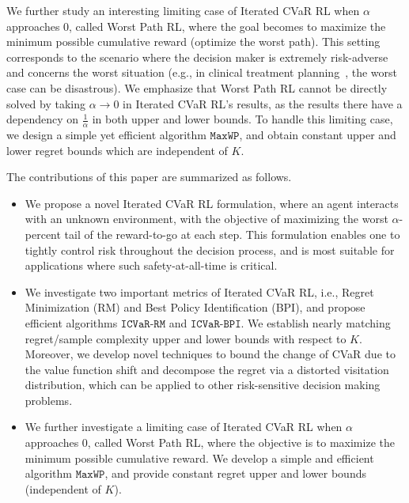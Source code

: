 \documentclass{article} %
\newcommand{\algcvar}{\mathtt{ICVaR\mbox{-}RM}}
\newcommand{\algcvarbpi}{\mathtt{ICVaR\mbox{-}BPI}}
\newcommand{\algmin}{\mathtt{MaxWP}}
\newcommand{\yihan}[1]{}
\newcommand{\siwei}[1]{}
\newcommand{\yihan}[1]{{\color{teal} [\text{Yihan:} #1]}}
\newcommand{\siwei}[1]{{\color{brown} [\text{Siwei:} #1]}}
\begin{document}
	
	We further study an interesting limiting case of Iterated CVaR RL when $\alpha$ approaches $0$, called Worst Path RL, where the goal becomes to maximize the minimum possible cumulative reward (optimize the worst path).  This setting corresponds to the scenario where the decision maker is extremely risk-adverse and concerns the worst situation (e.g., in clinical treatment planning~\citep{healthcare}, the worst case can be disastrous). 
	We emphasize that Worst Path RL cannot be directly solved by taking $\alpha \to 0$ 
	in Iterated CVaR RL's results, as the results there have a dependency on $\frac{1}{\alpha}$ in both upper and lower bounds. 
	To handle this limiting case, we design a simple yet efficient algorithm $\algmin$, and obtain constant upper and lower regret bounds which are independent of $K$. 
	
	The contributions of this paper are summarized as follows. 
	
	
	\begin{itemize}
		\item We propose a novel Iterated CVaR RL formulation, where an agent interacts with an unknown environment, with the objective of maximizing the worst $\alpha$-percent tail of the reward-to-go at each step. 
		This formulation enables one to tightly control risk throughout the decision process, and is most suitable for applications where such safety-at-all-time is critical.
		\item We investigate two important metrics of Iterated CVaR RL, i.e., Regret Minimization (RM) and Best Policy Identification (BPI), and propose efficient algorithms $\algcvar$ and $\algcvarbpi$. We establish nearly matching regret/sample complexity upper and lower bounds with respect to $K$. 
		Moreover, we develop novel techniques to bound the change of CVaR due to the value function shift and decompose the regret via a distorted visitation distribution, which can be applied to other risk-sensitive decision making problems.
		
		\item We further investigate a limiting case of Iterated CVaR RL when $\alpha$ approaches $0$, called Worst Path RL, where the objective is to maximize the minimum possible cumulative reward. We develop a simple and efficient algorithm $\algmin$, and provide constant regret upper and lower bounds (independent of $K$). 
	\end{itemize}
	
\end{document}
